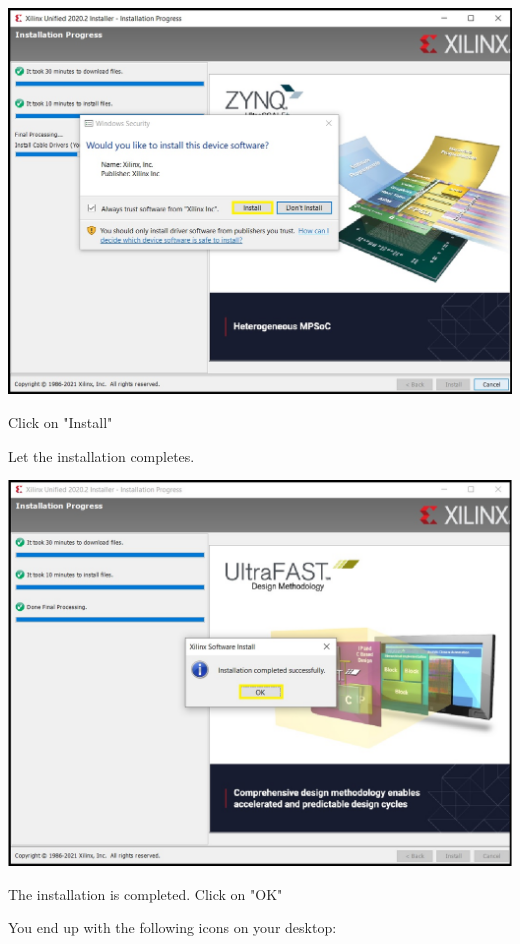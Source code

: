\includegraphics[width=\linewidth]{images/VivadoInstimg018.jpg}

Click on "Install"

Let the installation completes.

\includegraphics[width=\linewidth]{images/VivadoInstimg019.jpg}

The installation is completed. Click on "OK"

You end up with the following icons on your desktop:

